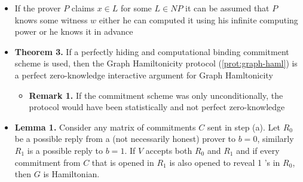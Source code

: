 \begin{itemize}
  \item If the prover $P$ claims $x \in L$ for some $L \in NP$ it can be assumed that $P$ knows some witness $w$ either he can computed it using his infinite computing power or he knows it in advance
  \item \textbf{Theorem 3.} If a perfectly hiding and computational binding commitment scheme is used, then the Graph Hamiltonicity protocol (\autoref{prot:graph-haml}) is a perfect zero-knowledge interactive argument for Graph Hamltonicity
  \begin{itemize}
  	\item \textbf{Remark 1.} If the commitment scheme was only unconditionally, the protocol would have been statistically and not perfect zero-knowledge
  \end{itemize}
  \item \textbf{Lemma 1.} Consider any matrix of commitments $C$ sent in step (a). Let $R_{0}$ be a possible reply from a (not necessarily honest) prover to $b=0$, similarly $R_{1}$ is a possible reply to $b=1$. If $V$ accepts both $R_{0}$ and $R_{1}$ and if every commitment from $C$ that is opened in $R_{1}$ is also opened to reveal 1 's in $R_{0}$, then $G$ is Hamiltonian.
\end{itemize}

\newpage


